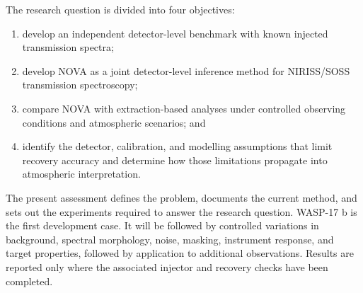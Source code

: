 The research question is divided into four objectives:
\begin{enumerate}[label=\arabic*.,leftmargin=1.5em]
  \item develop an independent detector-level benchmark with known injected
  transmission spectra;
  \item develop NOVA as a joint detector-level inference method for
  NIRISS/SOSS transmission spectroscopy;
  \item compare NOVA with extraction-based analyses under controlled observing
  conditions and atmospheric scenarios; and
  \item identify the detector, calibration, and modelling assumptions that
  limit recovery accuracy and determine how those limitations propagate into
  atmospheric interpretation.
\end{enumerate}


The present assessment defines the problem, documents the current method, and
sets out the experiments required to answer the research question. WASP-17 b is
the first development case. It will be followed by controlled variations in
background, spectral morphology, noise, masking, instrument response, and
target properties, followed by application to additional observations. Results
are reported only where the associated injector and recovery checks have been
completed.

